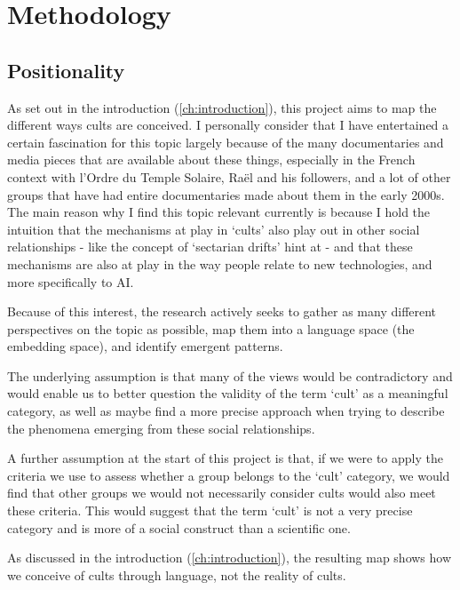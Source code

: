
\chapter{Methodology}\label{ch:methodology}

\section{Positionality}\label{sec:positionality}

As set out in the introduction (\ref{ch:introduction}), this project aims to map the different ways cults are conceived. I personally consider that I have entertained a certain fascination for this topic largely because of the many documentaries and media pieces that are available about these things, especially in the French context with l'Ordre du Temple Solaire, Raël and his followers, and a lot of other groups that have had entire documentaries made about them in the early 2000s. The main reason why I find this topic relevant currently is because I hold the intuition that the mechanisms at play in `cults' also play out in other social relationships - like the concept of `sectarian drifts' hint at - and that these mechanisms are also at play in the way people relate to new technologies, and more specifically to AI.

Because of this interest, the research actively seeks to gather as many different perspectives on the topic as possible, map them into a language space (the embedding space), and identify emergent patterns.

The underlying assumption is that many of the views would be contradictory and would enable us to better question the validity of the term `cult' as a meaningful category, as well as maybe find a more precise approach when trying to describe the phenomena emerging from these social relationships.

A further assumption at the start of this project is that, if we were to apply the criteria we use to assess whether a group belongs to the `cult' category, we would find that other groups we would not necessarily consider cults would also meet these criteria. This would suggest that the term `cult' is not a very precise category and is more of a social construct than a scientific one.

As discussed in the introduction (\ref{ch:introduction}), the resulting map shows how we conceive of cults through language, not the reality of cults.

